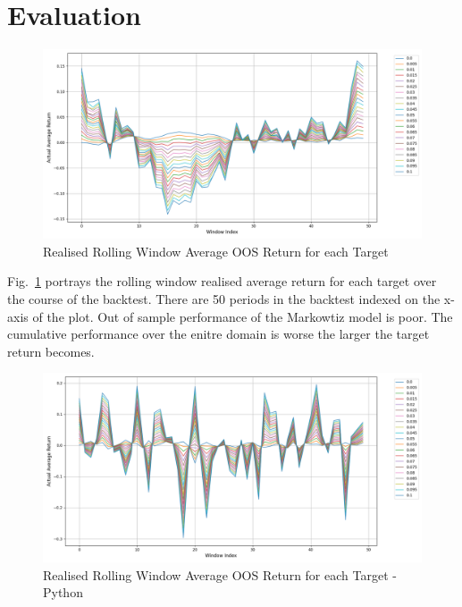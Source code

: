 \documentclass[12pt,twoside]{article}
\begin{document}
\section{Evaluation}

\begin{figure}[htbp!]
\centering %
\includegraphics[width = 1.0\hsize]{./figures/Realised_Rolling_Window_Average_OOS_Return_cpp.png} %
\caption{Realised Rolling Window Average OOS Return for each Target} 
\label{fig:OOS_rets}
\end{figure}


Fig.~\ref{fig:OOS_rets} portrays the rolling window realised average return for each target over the course of the backtest. There are 50 periods in the backtest indexed on the x-axis of the plot. Out of sample performance of the Markowtiz model is poor. The cumulative performance over the enitre domain is worse the larger the target return becomes. 
\linebreak

\begin{figure}[]
\centering %
\includegraphics[width = 1.0\hsize]{./figures/Realised_Rolling_Window_Average_OOS_Return.png} %
\caption{Realised Rolling Window Average OOS Return for each Target - Python} 
\label{fig:OOS_rets_python}
\end{figure}
\end{document}
